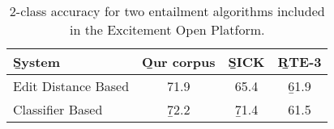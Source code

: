%

%
%

\begin{table}
\begin{center}
\def\t#1{\small{#1}}
\begin{tabular}{l@{\hskip \colspaceL}c@{\hskip \colspaceL}c@{\hskip \colspaceL}c}
\toprule
\b{System} & \b{Our corpus} & \b{SICK} & \b{RTE-3} \\
\midrule
\t{Edit Distance Based}        & \t{71.9} & \t{65.4} & \b{61.9} \\
\t{Classifier Based}           & \b{72.2} & \b{71.4} & \t{61.5} \\
\bottomrule
\end{tabular}
\end{center}
\caption{
\label{tab:eopresults}
2-class accuracy for two entailment algorithms included in the
  Excitement Open Platform.
}
\end{table}
%
%

